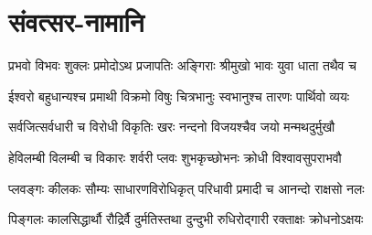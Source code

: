 \section{संवत्सर-नामानि}
\label{app:samvatsara_names}

\twolineshloka
{प्रभवो विभवः शुक्लः प्रमोदोऽथ प्रजापतिः}
{अङ्गिराः श्रीमुखो भावः युवा धाता तथैव च}

\twolineshloka
{ईश्वरो बहुधान्यश्च प्रमाथी विक्रमो विषुः}
{चित्रभानुः स्वभानुश्च तारणः पार्थिवो व्ययः}

\twolineshloka
{सर्वजित्सर्वधारी च विरोधी विकृतिः खरः}
{नन्दनो विजयश्चैव जयो मन्मथदुर्मुखौ}

\twolineshloka
{हेविलम्बी विलम्बी च विकारः शर्वरी प्लवः}
{शुभकृच्छोभनः क्रोधी विश्वावसुपराभवौ}

\twolineshloka
{प्लवङ्गः कीलकः सौम्यः साधारणविरोधिकृत्}
{परिधावी प्रमादी च आनन्दो राक्षसो नलः}

\twolineshloka
{पिङ्गलः कालसिद्धार्थौ रौद्रिर्वै दुर्मतिस्तथा}
{दुन्दुभी रुधिरोद्गारी रक्ताक्षः क्रोधनोऽक्षयः}

